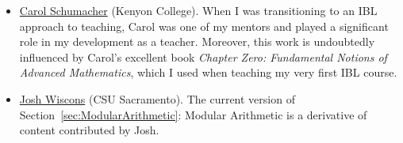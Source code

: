\begin{itemize}
\item \href{http://www2.kenyon.edu/Depts/Math/schumacherc/public_html/}{Carol Schumacher} (Kenyon College). When I was transitioning to an IBL approach to teaching, Carol was one of my mentors and played a significant role in my development as a teacher.  Moreover, this work is undoubtedly influenced by Carol's excellent book \emph{Chapter Zero: Fundamental Notions of Advanced Mathematics}, which I used when teaching my very first IBL course.
\item \href{http://webpages.csus.edu/wiscons/}{Josh Wiscons} (CSU Sacramento). The current version of Section~\ref{sec:ModularArithmetic}: Modular Arithmetic is a derivative of content contributed by Josh.
\end{itemize}
